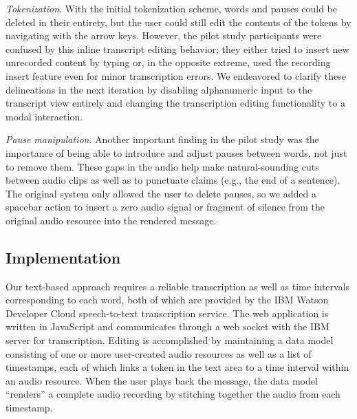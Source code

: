 \emph{Tokenization}. 
With the initial tokenization scheme, words and pauses could be deleted in their entirety, but the user could still edit the contents of the tokens by navigating with the arrow keys.
However, the pilot study participants were confused by this inline transcript editing behavior; they either tried to insert new unrecorded content by typing or, in the opposite extreme, used the recording insert feature even for minor transcription errors. 
We endeavored to clarify these delineations in the next iteration by disabling alphanumeric input to the transcript view entirely and changing the transcription editing functionality to a modal interaction.

\emph{Pause manipulation}.
Another important finding in the pilot study was the importance of being able to introduce and adjust pauses between words, not just to remove them. 
These gaps in the audio help make natural-sounding cuts between audio clips as well as to punctuate claims (e.g., the end of a sentence). 
The original system only allowed the user to delete pauses, so we added a spacebar action to insert a zero audio signal or fragment of silence from the original audio resource into the rendered message. 

\subsection{Implementation}
Our text-based approach requires a reliable transcription as well as time intervals corresponding to each word, both of which are provided by the IBM Watson Developer Cloud speech-to-text transcription service.
The web application is written in JavaScript and communicates through a web socket with the IBM server for transcription.
Editing is accomplished by maintaining a data model consisting of one or more user-created audio resources as well as a list of timestamps, each of which links a token in the text area to a time interval within an audio resource. 
When the user plays back the message, the data model ``renders'' a complete audio recording by stitching together the audio from each timestamp. 
